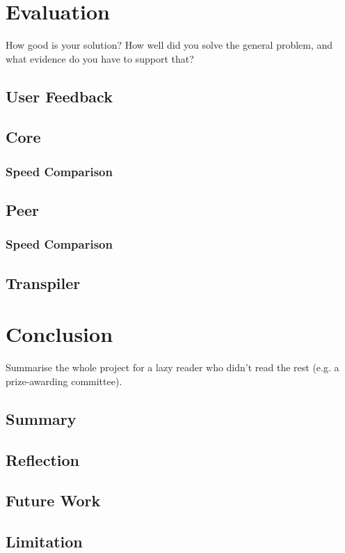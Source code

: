 \documentclass{l4proj}
\begin{document}
\chapter{Evaluation} 
How good is your solution? How well did you solve the general problem, and what evidence do you have to support that?

\section{User Feedback}
\section{Core}
\subsection{Speed Comparison}
\section{Peer}
\subsection{Speed Comparison}
\section{Transpiler}

\chapter{Conclusion}    
Summarise the whole project for a lazy reader who didn't read the rest (e.g. a prize-awarding committee).
\section{Summary}
\section{Reflection}
\section{Future Work}
\section{Limitation}
\end{document}
